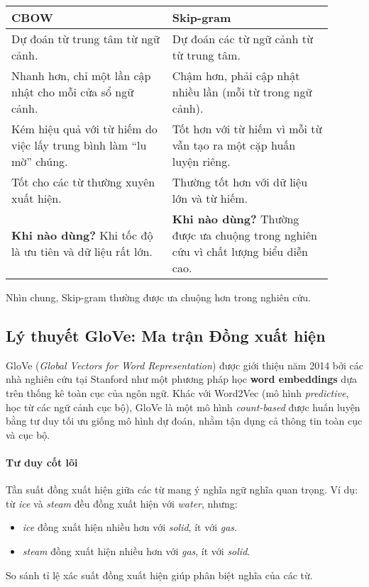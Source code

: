 \begin{tcolorbox}[
    title=So sánh CBOW và Skip-gram,
    colback=blue!5!white, colframe=blue!60!black, fonttitle=\bfseries
]
\begin{tabular}{p{0.45\linewidth} | p{0.45\linewidth}}
    \textbf{CBOW} & \textbf{Skip-gram} \\
    \hline
    Dự đoán từ trung tâm từ ngữ cảnh. & Dự đoán các từ ngữ cảnh từ từ trung tâm. \\
    \hline
    Nhanh hơn, chỉ một lần cập nhật cho mỗi cửa sổ ngữ cảnh. & Chậm hơn, phải cập nhật nhiều lần (mỗi từ trong ngữ cảnh). \\
    \hline
    Kém hiệu quả với từ hiếm do việc lấy trung bình làm “lu mờ” chúng. & Tốt hơn với từ hiếm vì mỗi từ vẫn tạo ra một cặp huấn luyện riêng. \\
    \hline
    Tốt cho các từ thường xuyên xuất hiện. & Thường tốt hơn với dữ liệu lớn và từ hiếm. \\
    \hline
    \textbf{Khi nào dùng?} Khi tốc độ là ưu tiên và dữ liệu rất lớn. & \textbf{Khi nào dùng?} Thường được ưa chuộng trong nghiên cứu vì chất lượng biểu diễn cao. \\
\end{tabular}
\end{tcolorbox}
Nhìn chung, Skip-gram thường được ưa chuộng hơn trong nghiên cứu.

\subsection{Lý thuyết GloVe: Ma trận Đồng xuất hiện}
\label{ssec:glove}

GloVe \cite{pennington2014glove} (\textit{Global Vectors for Word Representation}) được giới thiệu năm 2014 bởi các nhà nghiên cứu tại Stanford như một phương pháp học \textbf{word embeddings} dựa trên thống kê toàn cục của ngôn ngữ. 
Khác với Word2Vec (mô hình \textit{predictive}, học từ các ngữ cảnh cục bộ), GloVe là một mô hình \textit{count-based} được huấn luyện bằng tư duy tối ưu giống mô hình dự đoán, nhằm tận dụng cả thông tin toàn cục và cục bộ.

\paragraph{Tư duy cốt lõi}
Tần suất đồng xuất hiện giữa các từ mang ý nghĩa ngữ nghĩa quan trọng. Ví dụ: từ \textit{ice} và \textit{steam} đều đồng xuất hiện với \textit{water}, nhưng:
\begin{itemize}
    \item \textit{ice} đồng xuất hiện nhiều hơn với \textit{solid}, ít với \textit{gas}.
    \item \textit{steam} đồng xuất hiện nhiều hơn với \textit{gas}, ít với \textit{solid}.
\end{itemize}
So sánh tỉ lệ xác suất đồng xuất hiện giúp phân biệt nghĩa của các từ.

